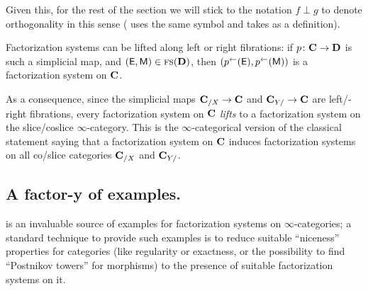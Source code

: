 Given this, for the rest of the section we will stick to the notation $f\perp g$ to denote orthogonality in this sense (\cite{Joy} uses the same symbol and takes  as a definition).
\begin{proposition}
Factorization systems can be lifted along left or right fibrations: if $p\colon \mathbf{C}\to \mathbf{D}$ is such a simplicial map, and $(\mathsf{E},\mathsf{M}) \in \text{\scshape fs}(\mathbf{D})$, then $(p^\leftarrow(\mathsf{E}), p^\leftarrow(\mathsf{M}))$ is a factorization system on $\mathbf{C}$.
\end{proposition}
\begin{corollary}
As a consequence, since the simplicial maps $\mathbf{C}_{/X}\to \mathbf{C}$ and $\mathbf{C}_{Y/}\to\mathbf{C}$ are left\fshyp{}right fibrations, every factorization system on $\mathbf{C}$ \emph{lifts} to a factorization system on the slice\fshyp{}coslice $\infty$\hyp{}category. This is the $\infty$\hyp{}categorical version of the classical statement saying that a factorization system on $\mathbf{C}$ induces factorization systems on all co\fshyp{}slice categories $\mathbf{C}_{/X}$ and $\mathbf{C}_{Y/}$.
\end{corollary}
\subsection{A factor-y of examples.}
\cite[pp\@. 178---]{Joy} is an invaluable source of examples for factorization systems on $\infty$\hyp{}categories; a standard technique to provide such examples is to reduce suitable ``niceness'' properties for categories (like regularity or exactness, or the possibility to find ``Postnikov towers'' for morphisms) to the presence of suitable factorization systems on it.

